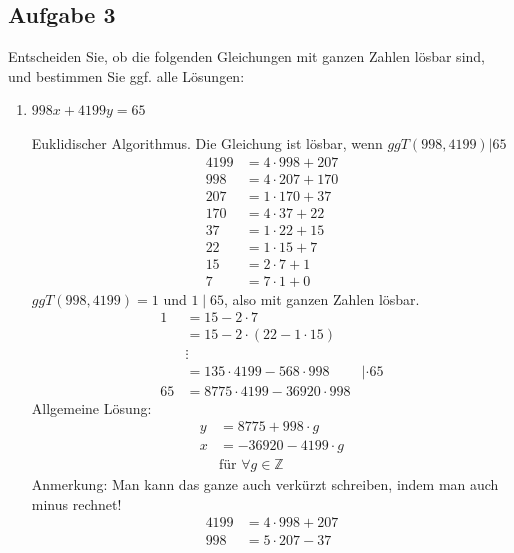 \documentclass{article} %
\begin{document}
    \subsection*{Aufgabe 3} 
    Entscheiden Sie, ob die folgenden Gleichungen mit ganzen Zahlen lösbar sind, und bestimmen Sie ggf. alle Lösungen:
    \begin{enumerate}
        \item[(a)] $998x + 4199y = 65$
        \begin{mybox}
        Euklidischer Algorithmus. Die Gleichung ist lösbar, wenn $ggT(998,4199) | 65$
        \begin{align*}
            4199 &= 4 \cdot 998 + 207 \\
            998 &= 4 \cdot 207 + 170 \\
            207 &= 1 \cdot 170 + 37 \\
            170 &= 4 \cdot 37 + 22 \\
            37 &= 1 \cdot 22 + 15 \\
            22 &= 1 \cdot 15 + 7 \\
            15 & = 2 \cdot 7 + 1 \\
            7 & = 7 \cdot 1 + 0 
        \end{align*}
        $ggT(998,4199)  = 1$ und $1 \mid 65$, also mit ganzen Zahlen lösbar. 
        \begin{align*}
            1 & = 15 - 2 \cdot 7 \\
            & = 15 - 2 \cdot (22 - 1 \cdot 15) \\
            & \vdots \\
            & = 135 \cdot 4199 - 568 \cdot 998 & | \cdot 65 \\
            65 & = 8775 \cdot 4199 - 36920 \cdot 998
        \end{align*}
        Allgemeine Lösung: 
        \begin{align*}
            y & = 8775 + 998 \cdot g \\
            x & = - 36920 - 4199 \cdot g \\
            & \text{für } \forall g \in \mathbb{Z}
        \end{align*} 
        \color{Blue}
        Anmerkung: 
        Man kann das ganze auch verkürzt schreiben, indem man auch minus rechnet! 
        \begin{align*}
            4199 & = 4 \cdot 998 + 207 \\
            998 & = 5 \cdot 207 - 37 \\

\end{align*}
\end{mybox}
\end{enumerate}
\end{document}

